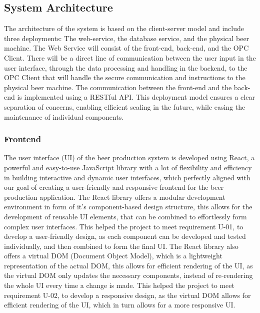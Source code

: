 \subsection{System Architecture}
The architecture of the system is based on the client-server model and include three deployments: The web-service, the database service, and the physical beer machine. \newline
The Web Service will consist of the front-end, back-end, and the OPC Client. There will be a direct line of communication between the user input in the user interface, through the data processing and handling in the backend, to the OPC Client that will handle the secure communication and instructions to the physical beer machine. \newline
The communication between the front-end and the back-end is implemented using a RESTful API. \newline
This deployment model ensures a clear separation of concerns, enabling efficient scaling in the future, while easing the maintenance of individual components.

\subsubsection{Frontend}
The user interface (UI) of the beer production system is developed using React, a powerful and easy-to-use JavaScript library with a lot of flexibility and efficiency in building interactive and dynamic user interfaces, which perfectly aligned with our goal of creating a user-friendly and responsive frontend for the beer production application.
The React library offers a modular development environment in form of it's component-based design structure, this allows for the development of reusable UI elements, that can be combined to effortlessly form complex user interfaces. This helped the project to meet requirement U-01, to develop a user-friendly design, as each component can be developed and tested individually, and then combined to form the final UI. \newline
The React library also offers a virtual DOM (Document Object Model), which is a lightweight representation of the actual DOM, this allows for efficient rendering of the UI, as the virtual DOM only updates the necessary components, instead of re-rendering the whole UI every time a change is made. This helped the project to meet requirement U-02, to develop a responsive design, as the virtual DOM allows for efficient rendering of the UI, which in turn allows for a more responsive UI. \newline

